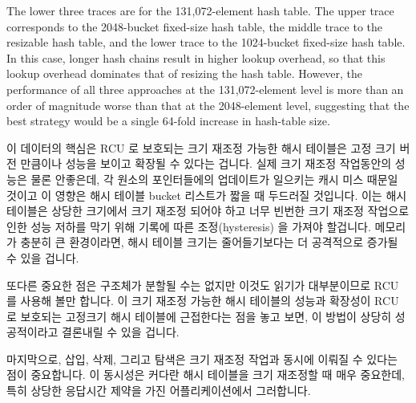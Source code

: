 The lower three traces are for the 131,072-element hash table.
The upper trace corresponds to the 2048-bucket fixed-size hash table,
the middle trace to the resizable hash table, and the lower trace
to the 1024-bucket fixed-size hash table.
In this case, longer hash chains result in higher lookup overhead,
so that this lookup overhead dominates that of resizing the hash
table.
However, the performance of all three approaches at the 131,072-element
level is more than an order of magnitude worse than that at the
2048-element level, suggesting that the best strategy would be
a single 64-fold increase in hash-table size.
\fi

이 데이터의 핵심은 RCU 로 보호되는 크기 재조정 가능한 해시 테이블은 고정 크기
버전 만큼이나 성능을 보이고 확장될 수 있다는 겁니다.
실제 크기 재조정 작업동안의 성능은 물론 안좋은데, 각 원소의 포인터들에의
업데이트가 일으키는 캐시 미스 때문일 것이고 이 영향은 해시 테이블 bucket
리스트가 짧을 때 두드러질 것입니다.
이는 해시 테이블은 상당한 크기에서 크기 재조정 되어야 하고 너무 빈번한 크기
재조정 작업으로 인한 성능 저하를 막기 위해 기록에 따른 조정(hysteresis) 을
가져야 할겁니다.
메모리가 충분히 큰 환경이라면, 해시 테이블 크기는 줄어들기보다는 더 공격적으로
증가될 수 있을 겁니다.

또다른 중요한 점은  구조체가 분할될 수는 없지만 이것도 읽기가
대부분이므로 RCU 를 사용해 볼만 합니다.
이 크기 재조정 가능한 해시 테이블의 성능과 확장성이 RCU 로 보호되는 고정크기
해시 테이블에 근접한다는 점을 놓고 보면, 이 방법이 상당히 성공적이라고 결론내릴
수 있을 겁니다.

마지막으로, 삽입, 삭제, 그리고 탐색은 크기 재조정 작업과 동시에 이뤄질 수
있다는 점이 중요합니다.
이 동시성은 커다란 해시 테이블을 크기 재조정할 때 매우 중요한데, 특히 상당한
응답시간 제약을 가진 어플리케이션에서 그러합니다.

